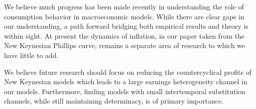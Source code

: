 \documentclass[12pt,a4paper]{article}
\begin{document}
We believe much progress has been made recently in understanding the role of consumption behavior in macroeconomic models. While there are clear gaps in our understanding, a path forward bridging both empirical results and theory is within sight. At present the dynamics of inflation, in our paper taken from the New Keynesian Phillips curve, remains a separate area of research to which we have little to add.

We believe future research should focus on reducing the countercyclical profits of New Keynesian models which leads to a large earnings heterogeneity channel in our models. Furthermore, finding models with small intertemporal substitution channels, while still maintaining determinacy, is of primary importance.



\small


\normalsize
\end{document}
